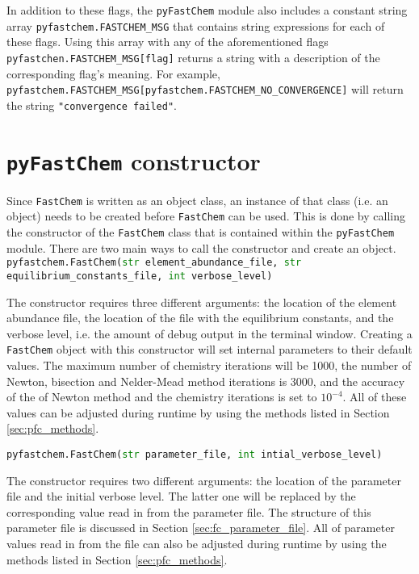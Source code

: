 \documentclass[numbers=noenddot]{fcmanual}
\newcommand{\fc}{\texttt{FastChem}\xspace}
\newcommand{\pfc}{\texttt{pyFastChem}\xspace}
\begin{document}
\bigbreak
          
In addition to these flags, the \pfc module also includes a constant string array \lstinline!pyfastchem.FASTCHEM_MSG! that contains string expressions for each of these flags. Using this array with any of the aforementioned flags \lstinline!pyfastchen.FASTCHEM_MSG[flag]! returns a string with a description of the corresponding flag's meaning. For example, \lstinline!pyfastchem.FASTCHEM_MSG[pyfastchem.FASTCHEM_NO_CONVERGENCE]! will return the string \lstinline!"convergence failed"!.


\section{\pfc constructor}

Since \fc is written as an object class, an instance of that class (i.e. an object) needs to be created before \fc can be used. This is done by calling the constructor of the \fc class that is contained within the \pfc module. There are two main ways to call the constructor and create an object.\\


\lstinline[language=Python, breaklines=true]!pyfastchem.FastChem(str element_abundance_file, str equilibrium_constants_file, int verbose_level)!
\begin{addmargin}[25pt]{0pt}
	The constructor requires three different arguments: the location of the element abundance file, the location of the file with the equilibrium constants, and the verbose level, i.e. the amount of debug output in the terminal window. Creating a \fc object with this constructor will set internal parameters to their default values. The maximum number of chemistry iterations will be 1000, the number of Newton, bisection and Nelder-Mead method iterations is 3000, and the accuracy of the of Newton method and the chemistry iterations is set to $10^{-4}$. All of these values can be adjusted during runtime by using the methods listed in Section \ref{sec:pfc_methods}.
\end{addmargin}

\bigbreak

\lstinline[language=Python]!pyfastchem.FastChem(str parameter_file, int intial_verbose_level)!
\begin{addmargin}[25pt]{0pt}
	The constructor requires two different arguments: the location of the parameter file and the initial verbose level. The latter one will be replaced by the corresponding value read in from the parameter file. The structure of this parameter file is discussed in Section \ref{sec:fc_parameter_file}. All of parameter values read in from the file can also be adjusted during runtime by using the methods listed in Section \ref{sec:pfc_methods}.
\end{addmargin}
\end{document}
